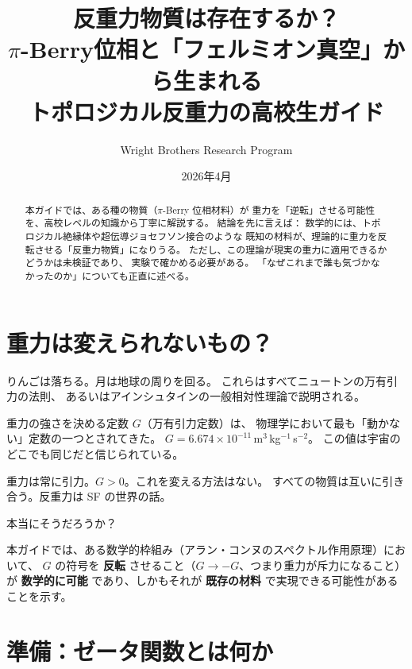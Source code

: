 \documentclass[11pt,a4paper]{article}
\title{反重力物質は存在するか？\\[6pt]
\large $\pi$-Berry位相と「フェルミオン真空」から生まれる\\
トポロジカル反重力の高校生ガイド}
\author{Wright Brothers Research Program}
\date{2026年4月}
\begin{document}
\maketitle

\begin{abstract}
本ガイドでは、ある種の物質（$\pi$-Berry 位相材料）が
重力を「逆転」させる可能性を、高校レベルの知識から丁寧に解説する。
結論を先に言えば：
数学的には、トポロジカル絶縁体や超伝導ジョセフソン接合のような
既知の材料が、理論的に重力を反転させる「反重力物質」になりうる。
ただし、この理論が現実の重力に適用できるかどうかは未検証であり、
実験で確かめる必要がある。
「なぜこれまで誰も気づかなかったのか」についても正直に述べる。
\end{abstract}

\tableofcontents
\newpage

\section{重力は変えられないもの？}

りんごは落ちる。月は地球の周りを回る。
これらはすべてニュートンの万有引力の法則、
あるいはアインシュタインの一般相対性理論で説明される。

重力の強さを決める定数 $G$（万有引力定数）は、
物理学において最も「動かない」定数の一つとされてきた。
$G = 6.674 \times 10^{-11}$\,m$^3$\,kg$^{-1}$\,s$^{-2}$。
この値は宇宙のどこでも同じだと信じられている。

\begin{tcolorbox}[colback=blue!5,colframe=blue!50!black,title=常識]
重力は常に引力。$G > 0$。これを変える方法はない。
すべての物質は互いに引き合う。反重力は SF の世界の話。
\end{tcolorbox}

本当にそうだろうか？

本ガイドでは、ある数学的枠組み（アラン・コンヌのスペクトル作用原理）において、
$G$ の符号を \textbf{反転} させること（$G \to -G$、つまり重力が斥力になること）が
\textbf{数学的に可能} であり、しかもそれが
\textbf{既存の材料} で実現できる可能性があることを示す。


\section{準備：ゼータ関数とは何か}
\end{document}
